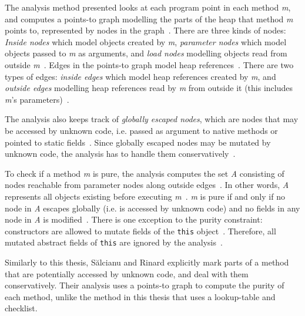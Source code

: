 \documentclass[a4paper,12pt]{article}
\begin{document}
The analysis method presented looks at each program point in each method \textit{m}, and computes a points-to graph modelling the parts of the heap that method \textit{m} points to, represented by nodes in the graph~\cite{salcianu}. There are three kinds of nodes: \textit{Inside nodes} which model objects created by \textit{m}, \textit{parameter nodes} which model objects passed to \textit{m} as arguments, and \textit{load nodes} modelling objects read from outside \textit{m}~\cite{salcianu}. Edges in the points-to graph model heap references~\cite{salcianu}. There are two types of edges: \textit{inside edges} which model heap references created by \textit{m}, and \textit{outside edges} modelling heap references read by \textit{m} from outside it (this includes \textit{m}'s parameters)~\cite{salcianu}.


The analysis also keeps track of \textit{globally escaped nodes}, which are nodes that may be accessed by unknown code, i.e. passed as argument to native methods or pointed to static fields~\cite{salcianu}. Since globally escaped nodes may be mutated by unknown code, the analysis has to handle them conservatively~\cite{salcianu}.

To check if a method \textit{m} is pure, the analysis computes the set \textit{A} consisting of nodes reachable from parameter nodes along outside edges~\cite{salcianu}. In other words, \textit{A} represents all objects existing before executing \textit{m}~\cite{salcianu}. \textit{m} is pure if and only if no node in \textit{A} escapes globally (i.e. is accessed by unknown code) and no fields in any node in \textit{A} is modified~\cite{salcianu}. There is one exception to the purity constraint: constructors are allowed to mutate fields of the \texttt{this} object~\cite{salcianu}. Therefore, all mutated abstract fields of \texttt{this} are ignored by the analysis~\cite{salcianu}.

Similarly to this thesis, S\u{a}lcianu and Rinard explicitly mark parts of a method that are potentially accessed by unknown code, and deal with them conservatively. Their analysis uses a points-to graph to compute the purity of each method, unlike the method in this thesis that uses a lookup-table and checklist.

\end{document}
